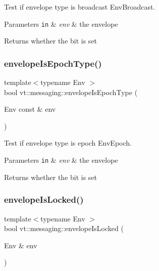 Test if envelope type is broadcast {\ttfamily Env\+Broadcast}. 


\begin{DoxyParams}[1]{Parameters}
\mbox{\tt in}  & {\em env} & the envelope\\
\hline
\end{DoxyParams}
\begin{DoxyReturn}{Returns}
whether the bit is set 
\end{DoxyReturn}
\mbox{\label{namespacevt_1_1messaging_a35972fd8b7d620e41e94e883e8e0cca4}} 
\subsubsection{\texorpdfstring{envelope\+Is\+Epoch\+Type()}{envelopeIsEpochType()}}
{\footnotesize\ttfamily template$<$typename Env $>$ \\
bool vt\+::messaging\+::envelope\+Is\+Epoch\+Type (\begin{DoxyParamCaption}\item[{Env const \&}]{env }\end{DoxyParamCaption})\hspace{0.3cm}{\ttfamily [inline]}}



Test if envelope type is epoch {\ttfamily Env\+Epoch}. 


\begin{DoxyParams}[1]{Parameters}
\mbox{\tt in}  & {\em env} & the envelope\\
\hline
\end{DoxyParams}
\begin{DoxyReturn}{Returns}
whether the bit is set 
\end{DoxyReturn}
\mbox{\label{namespacevt_1_1messaging_a6129f4cbd5fd124f342d1235694f664d}} 
\subsubsection{\texorpdfstring{envelope\+Is\+Locked()}{envelopeIsLocked()}}
{\footnotesize\ttfamily template$<$typename Env $>$ \\
bool vt\+::messaging\+::envelope\+Is\+Locked (\begin{DoxyParamCaption}\item[{Env \&}]{env }\end{DoxyParamCaption})\hspace{0.3cm}{\ttfamily [inline]}}



